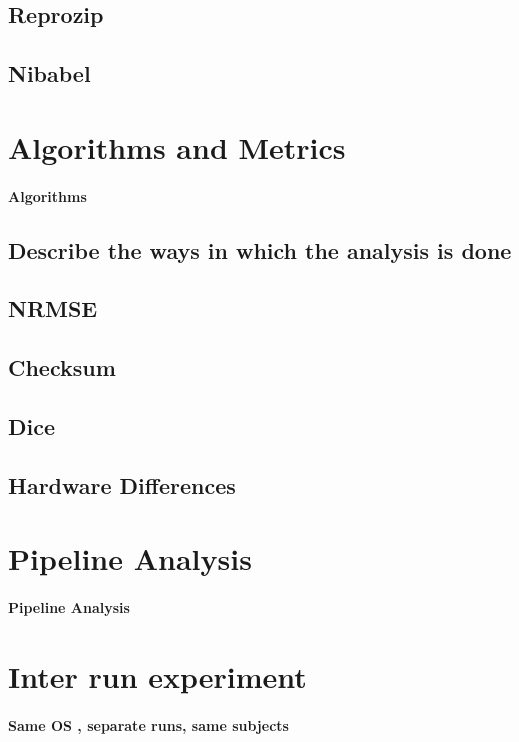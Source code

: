 \subsection{Reprozip}

\subsection{Nibabel}

\section{Algorithms and Metrics}
\paragraph{Algorithms}
\subsection{Describe the ways in which the analysis is done}
\subsection{NRMSE}
\subsection{Checksum}
\subsection{Dice}
\subsection{Hardware Differences}



\section{Pipeline Analysis}
\paragraph{Pipeline Analysis}

\section{Inter run experiment}
\paragraph{Same  OS , separate runs, same subjects}

